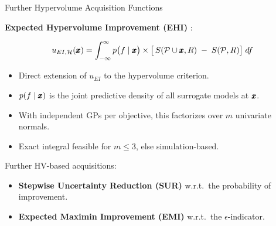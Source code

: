 \documentclass[11pt,compress,t,notes=noshow,xcolor=table]{beamer}
\begin{document}
\begin{vbframe}{Further Hypervolume Acquisition Functions}

\textbf{Expected Hypervolume Improvement (EHI)} 
:

\[
u_{EI, \mathcal{H}}(\pmb{x}) 
  = \int_{-\infty}^{\infty} p\bigl(f \mid \pmb{x}\bigr)
    \times \bigl[\,
        S(\mathcal{P} \cup \pmb{x}, R) \;-\; S(\mathcal{P}, R)
    \bigr]\; df
\]

\begin{itemize}
  \item Direct extension of $u_{EI}$ to the hypervolume criterion.
  \item $p(f \mid \pmb{x})$ is the joint predictive density of all surrogate models at $\pmb{x}$.
  \item With independent GPs per objective, this factorizes over $m$ univariate normals.
  \item Exact integral feasible for $m \le 3$, else simulation-based.
\end{itemize}

\medskip
Further HV-based acquisitions:
\begin{itemize}
  \item \textbf{Stepwise Uncertainty Reduction (SUR)} w.r.t.\ the probability of improvement.
  \item \textbf{Expected Maximin Improvement (EMI)} w.r.t.\ the $\epsilon$-indicator.
\end{itemize}

\end{vbframe}
\end{document}
